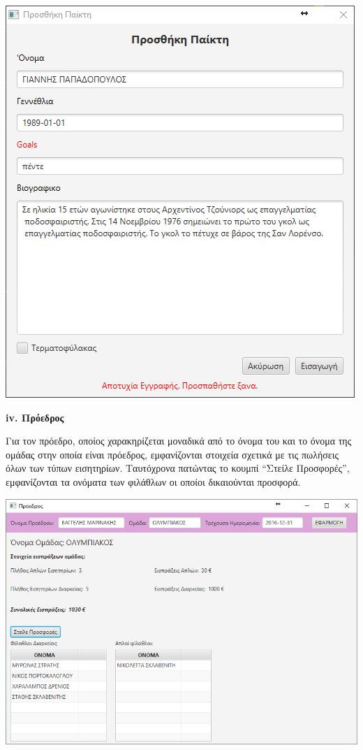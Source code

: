 \documentclass[a4paper,oneside,titlepage,11pt]{article}
\begin{document}
\begin{center} 
 \includegraphics[scale=0.76]{screens/4_create_error.PNG} 
\end{center} 


\noindent\textbf{iv. Πρόεδρος} 
\vspace{0.3cm}

\noindent Για τον πρόεδρο, οποίος χαρακηρίζεται μοναδικά από το όνομα του και το όνομα της ομάδας στην οποία είναι πρόεδρος, εμφανίζονται στοιχεία σχετικά με τις πωλήσεις όλων των τύπων εισητηρίων. Ταυτόχρονα πατώντας το κουμπί ``Στείλε Προσφορές'', εμφανίζονται τα ονόματα των φιλάθλων οι οποίοι δικαιούνται προσφορά. 

\begin{center}
 \includegraphics[scale=0.75]{screens/5_owner.PNG} 
\end{center} 
\end{document}
